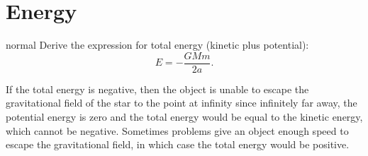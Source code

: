 \documentclass[11pt]{article}
\begin{document}
\section{Energy}
\vspace{-5mm}
\hypertarget{P4}{}
\begin{solution}{normal}
Derive the expression for total energy (kinetic plus potential):
\begin{equation}\label{eq:5}
    E=-\dfrac{GMm}{2a}.
\end{equation}
\end{solution}
If the total energy is negative, then the object is unable to escape the gravitational field of the star to the point at infinity since infinitely far away, the potential energy is zero and the total energy would be equal to the kinetic energy, which cannot be negative. Sometimes problems give an object enough speed to escape the gravitational field, in which case the total energy would be positive.

\vspace{-5mm}
\end{document}
